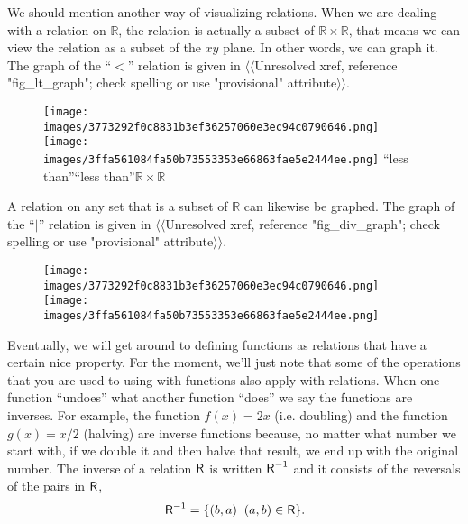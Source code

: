 \documentclass[10pt,]{book}
\theoremstyle{plain}
\theoremstyle{definition}
\theoremstyle{definition}
\numberwithin{equation}{section}
\newcommand{\suchthat}{\;  \;}
\newcommand{\Reals}{{\mathbb R}}
\newcommand{\relR}{\mbox{\textsf R}}
\newcommand{\lt}{ < }
\begin{document}
    We should mention another way of visualizing
    relations. When we are dealing with a relation on \(\Reals\), the
    relation is actually a subset of \(\Reals \times \Reals\), that means
    we can view the relation as a subset of the \(x\)\textendash{}\(y\) plane. In other
    words, we can graph it. The graph of the ``\(\lt\)'' relation is
    given in {$\langle\langle$Unresolved xref, reference "fig\_lt\_graph"; check spelling or use "provisional" attribute$\rangle\rangle$}.
\leavevmode%
\begin{figure}
\centering
\texttt{[image: images/3773292f0c8831b3ef36257060e3ec94c0790646.png]}
\texttt{[image: images/3ffa561084fa50b73553353e66863fae5e2444ee.png]}
``less than''``less than''\(\Reals \times \Reals\)\end{figure}
\par

    A relation on any set that is a subset of \(\Reals\) can likewise be
    graphed. The graph of the ``\(\mid\)'' relation is
    given in {$\langle\langle$Unresolved xref, reference "fig\_div\_graph"; check spelling or use "provisional" attribute$\rangle\rangle$}.
\leavevmode%
\begin{figure}
\centering
\texttt{[image: images/3773292f0c8831b3ef36257060e3ec94c0790646.png]}
\texttt{[image: images/3ffa561084fa50b73553353e66863fae5e2444ee.png]}
\end{figure}
\par

    Eventually, we will get around to defining functions as relations that
    have a certain nice property. For the moment, we'll just note that
    some of the operations that you are used to using with functions
    also apply with relations. When one function ``undoes'' what another
    function ``does'' we say the functions are inverses. For example,
    the function \(f(x)=2x\) (i.e. doubling) and the function \(g(x)=x/2\) (halving)
    are inverse functions because, no matter what number we start with, if we
    double it and then halve that result, we end up with the original number.
    The inverse of a relation \(\relR\) is written \(\relR^{-1}\) and it consists of
    the reversals of the pairs in \(\relR\),
    \begin{equation*}
      \relR^{-1} = \{ (b,a) \suchthat (a,b) \in \relR \}.
    \end{equation*}
\par
\end{document}

